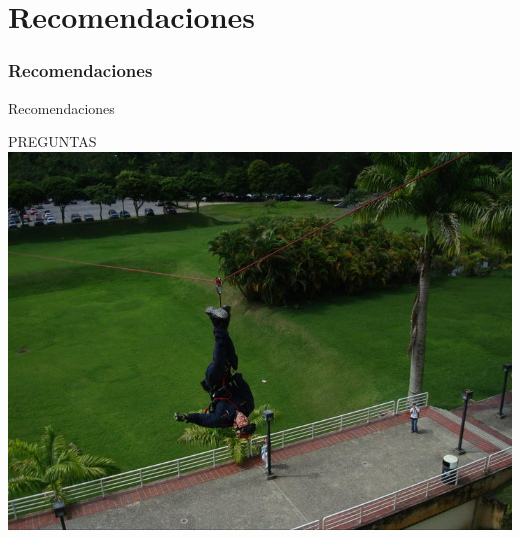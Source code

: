 \documentclass{beamer}
\begin{document}
\section{Recomendaciones}
\begin{frame}
\frametitle{Recomendaciones}
\begin{block}{Recomendaciones}

\end{block}
\end{frame}
\begin{frame}

\LARGE{PREGUNTAS}
\includegraphics[scale=0.25]{tirolesa}
\end{frame}
\end{document}
